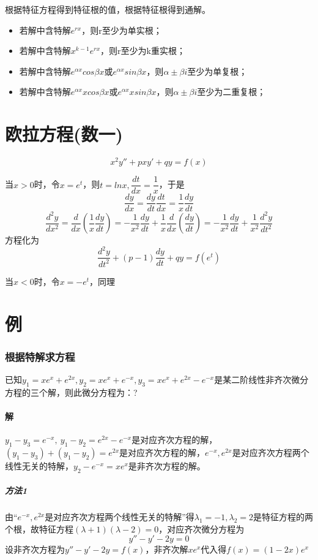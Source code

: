 根据特征方程得到特征根的值，根据特征根得到通解。
\begin{itemize}
    \item 若解中含特解\(e^{rx}\)，则r至少为单实根；
    \item 若解中含特解\(x^{k - 1}e^{rx}\)，则r至少为k重实根；
    \item 若解中含特解\(e^{\alpha x}cos\beta x\)或\(e^{\alpha x}sin\beta x\)，则\(\alpha \pm \beta i\)至少为单复根；
    \item 若解中含特解\(e^{\alpha x}xcos\beta x\)或\(e^{\alpha x}xsin\beta x\)，则\(\alpha \pm \beta i\)至少为二重复根；
\end{itemize}


\section{欧拉方程(数一)}
\[x^2y'' + pxy' + qy = f(x)\]

当\(x > 0\)时，令\(x = e^t\)，则\(t = lnx, \dfrac{dt}{dx} = \dfrac{1}{x}\)，于是
\[\dfrac{dy}{dx} = \dfrac{dy}{dt} \dfrac{dt}{dx} = \dfrac{1}{x} \dfrac{dy}{dt}\]
\[\dfrac{d^2y}{dx^2} = \dfrac{d}{dx}(\dfrac{1}{x}\dfrac{dy}{dt}) = -\dfrac{1}{x^2}\dfrac{dy}{dt} + \dfrac{1}{x}\dfrac{d}{dx}(\dfrac{dy}{dt}) = -\dfrac{1}{x^2}\dfrac{dy}{dt} + \dfrac{1}{x^2}\dfrac{d^2y}{dt^2}\]
方程化为\[\dfrac{d^2y}{dt^2} + (p - 1)\dfrac{dy}{dt} + qy = f(e^t)\]

当\(x < 0\)时，令\(x = -e^t\)，同理


\section{例}

\subsubsection{根据特解求方程}
已知\(y_1 = xe^x + e^{2x}, y_2 = xe^x + e^{-x}, y_3 = xe^x + e^{2x} - e^{-x}\)是某二阶线性非齐次微分方程的三个解，则此微分方程为：?
\paragraph{解}
\(y_1 - y_3 = e^{-x},\ y_1 - y_2 = e^{2x} - e^{-x}\)是对应齐次方程的解，\((y_1 - y_3) + (y_1 - y_2) = e^{2x}\)是对应齐次方程的解，\(e^{-x}, e^{2x}\)是对应齐次方程两个线性无关的特解，\(y_2 - e^{-x} = xe^x\)是非齐次方程的解。

\subparagraph{方法1}
由“\(e^{-x}, e^{2x}\)是对应齐次方程两个线性无关的特解”得\(\lambda_1 = -1, \lambda_2 = 2\)是特征方程的两个根，故特征方程\((\lambda + 1)(\lambda - 2) = 0\)，对应齐次微分方程为\[y'' - y' - 2y = 0\]
设非齐次方程为\(y'' - y' - 2y = f(x)\)，非齐次解\(xe^x\)代入得\(f(x) = (1 - 2x)e^x\)

